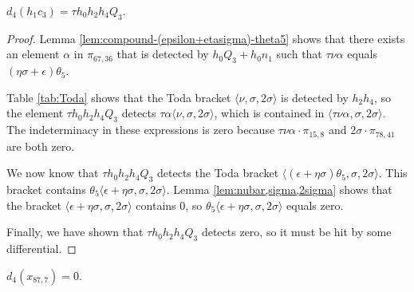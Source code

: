 
\begin{lemma}
\label{lem:d4-h1c3}
$d_4(h_1 c_3) = \tau h_0 h_2 h_4 Q_3$.
\end{lemma}

\begin{proof}
Lemma \ref{lem:compound-(epsilon+etasigma)-theta5}
shows that there exists an element
$\alpha$ in $\pi_{67,36}$ that is detected by
$h_0 Q_3 + h_0 n_1$ such that
$\tau \nu \alpha$ equals
$(\eta \sigma + \epsilon) \theta_5$.

Table \ref{tab:Toda} shows that the Toda bracket
$\langle \nu, \sigma, 2\sigma \rangle$ is detected by $h_2 h_4$, so
the element
$\tau h_0 h_2 h_4 Q_3$ detects
$\tau \alpha \langle \nu, \sigma, 2 \sigma \rangle$,
which is contained in
$\langle \tau \nu \alpha, \sigma, 2 \sigma \rangle$.
The indeterminacy in these expressions
is zero because
$\tau \nu \alpha \cdot \pi_{15,8}$ and
$2 \sigma \cdot \pi_{78,41}$ are both zero.

We now know that
$\tau h_0 h_2 h_4 Q_3$ detects the Toda bracket
$\langle (\epsilon + \eta \sigma) \theta_5, \sigma, 2 \sigma \rangle$.
This bracket contains
$\theta_5 \langle \epsilon + \eta \sigma, \sigma, 2 \sigma \rangle$.
Lemma \ref{lem:nubar,sigma,2sigma} shows that 
the bracket
$\langle \epsilon + \eta \sigma, \sigma, 2 \sigma \rangle$ contains
$0$, so
$\theta_5 \langle \epsilon + \eta \sigma, \sigma, 2 \sigma \rangle$
equals zero.

Finally, we have shown that $\tau h_0 h_2 h_4 Q_3$
detects zero, so it must be hit by some differential.
\end{proof}

\begin{lemma}
\label{lem:d4-x87,7}
$d_4(x_{87,7}) = 0$.
\end{lemma}


